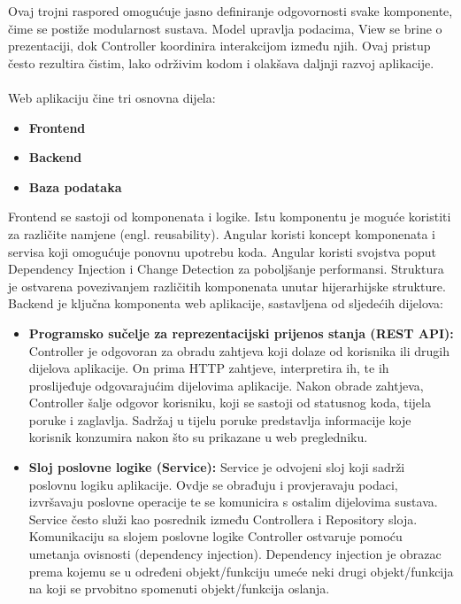 {				Ovaj trojni raspored omogućuje jasno definiranje odgovornosti svake komponente, čime se postiže modularnost sustava. Model upravlja podacima, View se brine o prezentaciji, dok Controller koordinira interakcijom između njih. Ovaj pristup često rezultira čistim, lako održivim kodom i olakšava daljnji razvoj aplikacije.
				\\
				\\
				Web aplikaciju čine tri osnovna dijela:
				\begin{itemize}
					\item \textbf{Frontend}
					\item \textbf{Backend}
					\item \textbf{Baza podataka}
				\end{itemize}
				
				Frontend se sastoji od komponenata i logike. Istu komponentu je moguće koristiti za različite namjene (engl. reusability). Angular koristi koncept komponenata i servisa koji omogućuje ponovnu upotrebu koda.  Angular koristi svojstva poput Dependency Injection i Change Detection za poboljšanje performansi. Struktura je ostvarena povezivanjem različitih komponenata unutar hijerarhijske strukture.\\
				
				Backend je ključna komponenta web aplikacije, sastavljena od sljedećih dijelova:
				
				\begin{itemize}
					\item \textbf{Programsko sučelje za reprezentacijski prijenos stanja (REST API):}
					Controller je odgovoran za obradu zahtjeva koji dolaze od korisnika ili drugih dijelova aplikacije. On prima HTTP zahtjeve, interpretira ih, te ih proslijeđuje odgovarajućim dijelovima aplikacije. Nakon obrade zahtjeva, Controller šalje odgovor korisniku, koji se sastoji od statusnog koda, tijela poruke i zaglavlja. Sadržaj u tijelu poruke predstavlja informacije koje korisnik konzumira nakon što su prikazane u web pregledniku.
					
					\item \textbf{Sloj poslovne logike (Service):}
					Service je odvojeni sloj koji sadrži poslovnu logiku aplikacije. Ovdje se obrađuju i provjeravaju podaci, izvršavaju poslovne operacije te se komunicira s ostalim dijelovima sustava. Service često služi kao posrednik između Controllera i Repository sloja. Komunikaciju sa slojem poslovne logike Controller ostvaruje pomoću umetanja ovisnosti (dependency injection). Dependency injection je obrazac prema kojemu se u određeni objekt/funkciju umeće neki drugi objekt/funkcija na koji se prvobitno spomenuti objekt/funkcija oslanja.
					

\end{itemize}}
